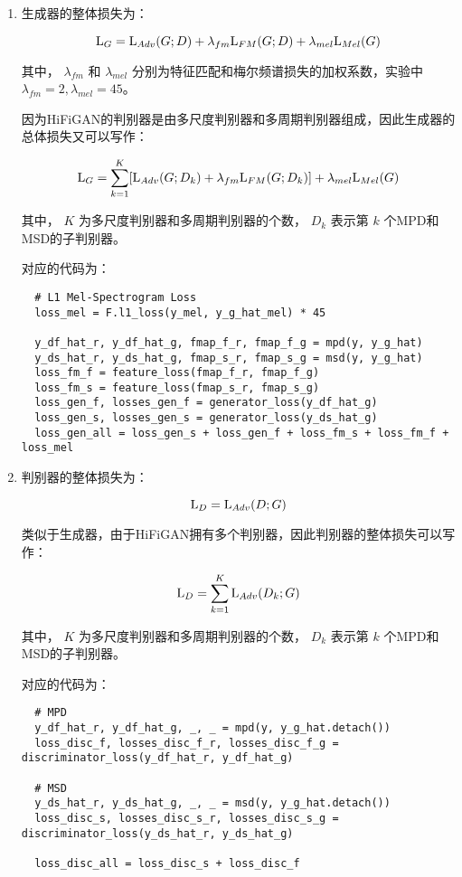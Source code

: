 \documentclass[cn,10pt,math=newtx,citestyle=gb7714-2015,bibstyle=gb7714-2015]{elegantbook}
\begin{document}
\begin{enumerate}
  \item 生成器的整体损失为：

  \begin{equation}
    {\rm L}_G={\rm L}_{Adv}(G;D)+\lambda_{fm}{\rm L}_{FM}(G;D)+\lambda_{mel}{\rm L}_{Mel}(G)
  \end{equation}
  
  其中， $\lambda_{fm}$ 和 $\lambda_{mel}$ 分别为特征匹配和梅尔频谱损失的加权系数，实验中 $\lambda_{fm}=2,\lambda_{mel}=45$。
  
  因为HiFiGAN的判别器是由多尺度判别器和多周期判别器组成，因此生成器的总体损失又可以写作：
  
  \begin{equation}
    {\rm L}_G=\sum_{k=1}^K[{\rm L}_{Adv}(G;D_k)+\lambda_{fm}{\rm L}_{FM}(G;D_k)]+\lambda_{mel}{\rm L}_{Mel}(G)
  \end{equation}

  其中， $K$ 为多尺度判别器和多周期判别器的个数， $D_k$ 表示第 $k$ 个MPD和MSD的子判别器。
  
  对应的代码为：
  
  \begin{lstlisting}
  # L1 Mel-Spectrogram Loss
  loss_mel = F.l1_loss(y_mel, y_g_hat_mel) * 45
  
  y_df_hat_r, y_df_hat_g, fmap_f_r, fmap_f_g = mpd(y, y_g_hat)
  y_ds_hat_r, y_ds_hat_g, fmap_s_r, fmap_s_g = msd(y, y_g_hat)
  loss_fm_f = feature_loss(fmap_f_r, fmap_f_g)
  loss_fm_s = feature_loss(fmap_s_r, fmap_s_g)
  loss_gen_f, losses_gen_f = generator_loss(y_df_hat_g)
  loss_gen_s, losses_gen_s = generator_loss(y_ds_hat_g)
  loss_gen_all = loss_gen_s + loss_gen_f + loss_fm_s + loss_fm_f + loss_mel
  \end{lstlisting}

  \item 判别器的整体损失为：

  \begin{equation}
    {\rm L}_D={\rm L}_{Adv}(D;G)
  \end{equation}

  类似于生成器，由于HiFiGAN拥有多个判别器，因此判别器的整体损失可以写作：

  \begin{equation}
    {\rm L}_D=\sum_{k=1}^K{\rm L}_{Adv}(D_k;G)
  \end{equation}

  其中， $K$ 为多尺度判别器和多周期判别器的个数， $D_k$ 表示第 $k$ 个MPD和MSD的子判别器。

  对应的代码为：

  \begin{lstlisting}
  # MPD
  y_df_hat_r, y_df_hat_g, _, _ = mpd(y, y_g_hat.detach())
  loss_disc_f, losses_disc_f_r, losses_disc_f_g = discriminator_loss(y_df_hat_r, y_df_hat_g)

  # MSD
  y_ds_hat_r, y_ds_hat_g, _, _ = msd(y, y_g_hat.detach())
  loss_disc_s, losses_disc_s_r, losses_disc_s_g = discriminator_loss(y_ds_hat_r, y_ds_hat_g)

  loss_disc_all = loss_disc_s + loss_disc_f
  \end{lstlisting}

\end{enumerate}
\end{document}
